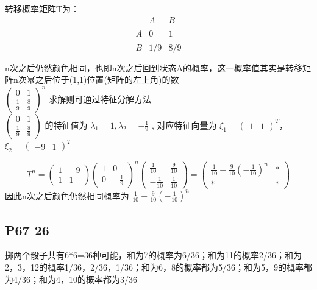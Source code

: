 \documentclass[10pt,a4paper]{article}
\begin{document}
转移概率矩阵T为：
\[ 
\begin{array}{ccc}
  & A & B\\\\
A & 0 & 1\\\\
B & 1/9 & 8/9\\\\
\end{array} 
\] 
n次之后仍然颜色相同，也即n次之后回到状态A的概率，这一概率值其实是转移矩阵n次幂之后位于(1,1)位置(矩阵的左上角)的数\\
$ {\begin{pmatrix} 0&1\\ \frac{1}{9}& \frac{8}{9} \end{pmatrix}}^n $ 求解则可通过特征分解方法\\
$ {\begin{pmatrix} 0&1\\ \frac{1}{9}& \frac{8}{9} \end{pmatrix}} $ 的特征值为 $\lambda_1=1, \lambda_2=-\frac{1}{9}$ , 对应特征向量为   $ \xi_1={\left(\begin{array}{cc} 1 & 1  \end{array} \right)}^T $，$ \xi_2={\left(\begin{array}{cc} -9 & 1  \end{array} \right)}^T $

\[ T^n=
\left(
\begin{array}{cc}
1 & -9 \\
1 & 1
\end{array}
\right)
{\begin{pmatrix} 1&0\\ 0& -\frac{1}{9} \end{pmatrix}}^n
\left(
\begin{array}{cc}
\frac{1}{10} & \frac{9}{10} \\
-\frac{1}{10} & \frac{1}{10}
\end{array}
\right) = \left(
\begin{array}{cc}
\frac{1}{10}+\frac{9}{10}(-\frac{1}{10})^n & * \\
* & *
\end{array}
\right)
 \]
因此n次之后颜色仍然相同概率为 $ \frac{1}{10}+\frac{9}{10}(-\frac{1}{10})^n $


\subsection{P67 26}
掷两个骰子共有6*6=36种可能，和为7的概率为6/36；和为11的概率2/36；和为2，3，12的概率1/36，2/36，1/36；和为6，8的概率都为5/36；和为5，9的概率都为4/36；和为4，10的概率都为3/36 \\
\end{document}
